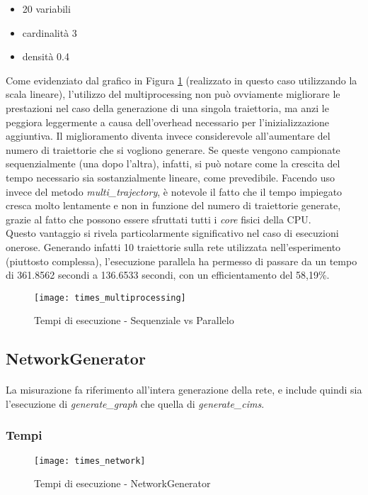   \begin{itemize}
    \item 20 variabili
    \item cardinalità 3
    \item densità 0.4
  \end{itemize}

  Come evidenziato dal grafico in Figura \ref{fig:seq_vs_par} (realizzato in questo caso utilizzando la scala lineare), 
  l'utilizzo del multiprocessing non può ovviamente migliorare le prestazioni nel caso della generazione di una singola traiettoria,
  ma anzi le peggiora leggermente a causa dell'overhead necessario per l'inizializzazione aggiuntiva.
  Il miglioramento diventa invece considerevole all'aumentare del numero di traiettorie che si vogliono generare.
  Se queste vengono campionate sequenzialmente (una dopo l'altra), infatti, si può notare come
  la crescita del tempo necessario sia sostanzialmente lineare, come prevedibile. Facendo uso invece
  del metodo \textit{multi\_trajectory}, è notevole il fatto che il tempo impiegato cresca molto lentamente
  e non in funzione del numero di traiettorie generate, grazie al fatto che 
  possono essere sfruttati tutti i \textit{core} fisici della CPU.\\
  Questo vantaggio si rivela particolarmente significativo nel caso di esecuzioni onerose.
  Generando infatti 10 traiettorie sulla rete utilizzata nell'esperimento (piuttosto complessa),
  l'esecuzione parallela ha permesso di passare da un tempo di 361.8562 secondi a 136.6533 secondi, con un
  efficientamento del 58,19\%.

  \begin{figure}[H]
    \texttt{[image: times\_multiprocessing]}
    \centering
    \caption{Tempi di esecuzione - Sequenziale vs Parallelo}
    \label{fig:seq_vs_par}
  \end{figure}

  \subsection{NetworkGenerator}
  \paragraph{}
  La misurazione fa riferimento all'intera generazione della rete, e include quindi sia l'esecuzione 
  di \textit{generate\_graph} che quella di \textit{generate\_cims}. 

  \subsubsection{Tempi}
  \begin{figure}[H]
    \texttt{[image: times\_network]}
    \centering
    \caption{Tempi di esecuzione - NetworkGenerator}
  \end{figure}

